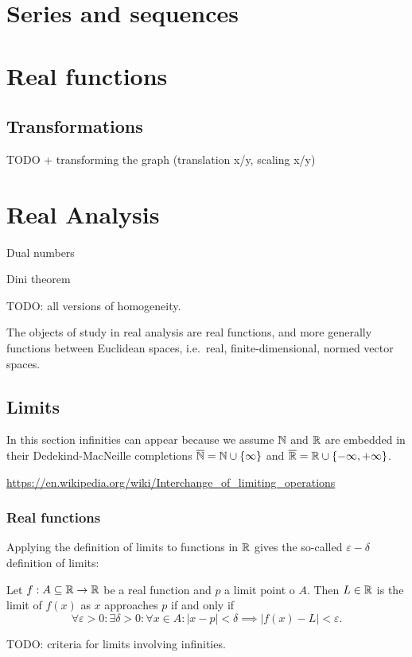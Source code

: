 \chapter{Series and sequences}


\chapter{Real functions}

\section{Transformations}
TODO + transforming the graph (translation x/y, scaling x/y)

\chapter{Real Analysis}
Dual numbers

Dini theorem

TODO: all versions of homogeneity.

The objects of study in real analysis are real functions, and more generally functions between Euclidean spaces, i.e.\ real, finite-dimensional, normed vector spaces.

\section{Limits}
In this section infinities can appear because we assume $\mathbb{N}$ and $\mathbb{R}$ are embedded in their Dedekind-MacNeille completions $\overline{\mathbb{N}} = \mathbb{N}\cup\{\infty\}$ and $\overline{\mathbb{R}} = \mathbb{R}\cup\{-\infty, +\infty\}$.

\url{https://en.wikipedia.org/wiki/Interchange_of_limiting_operations}


\subsection{Real functions}
Applying the definition of limits to functions in $\mathbb{R}$ gives the so-called $\varepsilon-\delta$ definition of limits:
\begin{proposition}
Let $f:A\subseteq\mathbb{R}\to\mathbb{R}$ be a real function and $p$ a limit point o $A$. Then $L\in \mathbb{R}$ is the limit of $f(x)$ as $x$ approaches $p$ \textup{if and only if}
\[ \forall \varepsilon>0: \exists \delta> 0: \forall x\in A: |x-p| < \delta \implies |f(x)-L|<\varepsilon. \]
\end{proposition}
TODO: criteria for limits involving infinities.

